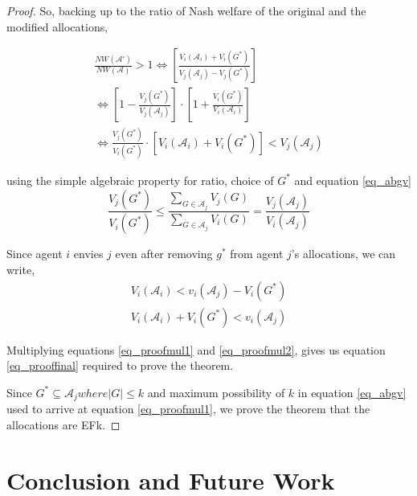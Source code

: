 \begin{proof}
So, backing up to the ratio of Nash welfare of the original and the modified allocations,

\begin{equation}
\label{eq_prooffinal}
\begin{gathered}
    \frac{NW(\mathcal{A}')}{NW(\mathcal{A})} > 1 \Leftrightarrow \left[\frac{V_i(\mathcal{A}_i) + V_i(G^*)}{V_j(\mathcal{A}_j) - V_j(G^*)}\right] \\
    \Leftrightarrow \left[1 - \frac{V_j(G^*)}{V_j(\mathcal{A}_j)}\right] \cdot \left[1 + \frac{V_i(G^*)}{V_i(\mathcal{A}_i)}\right] \\
    \Leftrightarrow \frac{V_j(G^*)}{V_i(G^*)} \cdot \left[V_i(\mathcal{A}_i) + V_i(G^*) \right] < V_j(\mathcal{A}_j)
\end{gathered}
\end{equation}

using the simple algebraic property for ratio, choice of $G^*$ and equation \ref{eq_abgv}
\begin{equation}
\label{eq_proofmul1}
    \frac{V_j(G^*)}{V_i(G^*)} \leq \frac{\sum_{G \in \mathcal{A}_j}V_j(G)}{\sum_{G \in \mathcal{A}_j}V_i(G)} = \frac{V_j(\mathcal{A}_j)}{V_i(\mathcal{A}_j)}
\end{equation}

Since agent $i$ envies $j$ even after removing $g^*$ from agent $j$'s allocations, we can write,
\begin{equation}
\label{eq_proofmul2}
\begin{gathered}
    V_i(\mathcal{A}_i) < v_i(\mathcal{A}_j) - V_i(G^*) \\
    V_i(\mathcal{A}_i) + V_i(G^*) < v_i(\mathcal{A}_j)
\end{gathered}
\end{equation}

Multiplying equations \ref{eq_proofmul1} and \ref{eq_proofmul2}, gives us equation \ref{eq_prooffinal} required to prove the theorem.

Since $G^* \subseteq \mathcal{A}_j where |G| \leq k$ and maximum possibility of $k$ in equation \ref{eq_abgv} used to arrive at equation \ref{eq_proofmul1}, we prove the theorem that the allocations are EFk.

\end{proof}

\section{Conclusion and Future Work}
\label{section_conclusion}

